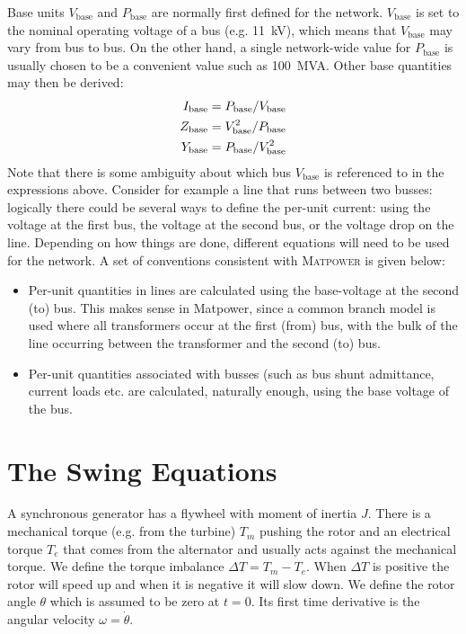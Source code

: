 \documentclass[11pt]{article}
\begin{document}
Base units $V_\text{base}$ and $P_\text{base}$ are normally first defined for the network. $V_\text{base}$ is set to the nominal operating voltage of a bus (e.g. 11~kV), which means that $V_\text{base}$ may vary from bus to bus. On the other hand, a single network-wide value for $P_\text{base}$ is usually chosen to be a convenient value such as 100~MVA. Other base quantities may then be derived:
\begin{align}
	I_\text{base} &= P_\text{base}/V_\text{base} \notag \\
	Z_\text{base} &= V_\text{base}^2 / P_\text{base} \notag \\
	Y_\text{base} &= P_\text{base} / V_\text{base}^2
\end{align}
Note that there is some ambiguity about which bus $V_\text{base}$ is referenced to in the expressions above. Consider for example a line that runs between two busses: logically there could be several ways to define the per-unit current: using the voltage at the first bus, the voltage at the second bus, or the voltage drop on the line. Depending on how things are done, different equations will need to be used for the network. A set of conventions consistent with \textsc{Matpower} is given below:
\begin{itemize}
\item Per-unit quantities in lines are calculated using the base-voltage at the second (to) bus. This makes sense in Matpower, since a common branch model is used where all transformers occur at the first (from) bus, with the bulk of the line occurring between the transformer and the second (to) bus.
\item Per-unit quantities associated with busses (such as bus shunt admittance, current loads etc. are calculated, naturally enough, using the base voltage of the bus.
\end{itemize}

\section{The Swing Equations}
A synchronous generator has a flywheel with moment of inertia $J$. There is a mechanical torque (e.g. from the turbine) $T_m$ pushing the rotor and an electrical torque $T_e$ that comes from the alternator and usually acts against the mechanical torque. We define the torque imbalance $\Delta T = T_m - T_e$. When $\Delta T$ is positive the rotor will speed up and when it is negative it will slow down. We define the rotor angle $\theta$ which is assumed to be zero at $t = 0$. Its first time derivative is the angular velocity $\omega = \dot{\theta}$.
\end{document}
